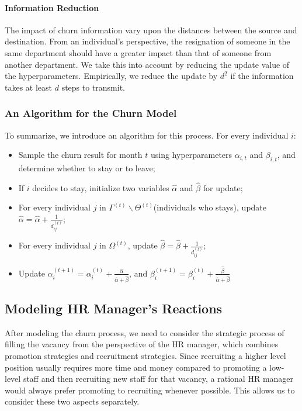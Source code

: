 \documentclass[tcn = 37075, sheet = false, abstract = false]{mcmthesis}
\begin{document}
\paragraph{Information Reduction} The impact of churn information vary upon the distances between the source and destination. From an individual's perspective, the resignation of someone in the same department should have a greater impact than that of someone from another department. We take this into account by reducing the update value of the hyperparameters. Empirically, we reduce the update by $d^2$ if the information takes at least $d$ steps to transmit. 

\subsubsection{An Algorithm for the Churn Model}
To summarize, we introduce an algorithm for this process. For every individual $i$:
\begin{itemize}
\item Sample the churn result for month $t$ using hyperparameters $\alpha_{i,t}$ and $\beta_{i,t}$, and determine whether to stay or to leave;
\item If $i$ decides to stay, initialize two variables $\hat{\alpha}$ and $\hat{\beta}$ for update;
\item For every individual $j$ in $\Gamma^{(t)} \backslash \Theta^{(t)}$(individuals who stays), update $\hat{\alpha} = \hat{\alpha} + \frac{1}{d_{ij}^{(t)}}$;
\item For every individual $j$ in $\Omega^{(t)}$, update $ \hat{\beta} = \hat{\beta} + \frac{1}{d_{ij}^{(t)}}$;
\item Update $ \alpha_{i}^{(t+1)}=\alpha_{i}^{(t)}+\frac{\hat{\alpha}}{\hat{\alpha}+\hat{\beta}}$, and $ \beta_{i}^{(t+1)}=\beta_{i}^{(t)}+\frac{\hat{\beta}}{\hat{\alpha}+\hat{\beta}}$
\end{itemize}

\subsection{Modeling HR Manager's Reactions}

After modeling the churn process, we need to consider the strategic process of filling the vacancy from the perspective of the HR manager, which combines promotion strategies and recruitment strategies. Since recruiting a higher level position usually requires more time and money compared to promoting a low-level staff and then recruiting new staff for that vacancy, a rational HR manager would always prefer promoting to recruiting whenever possible. This allows us to consider these two aspects separately.
\end{document}
